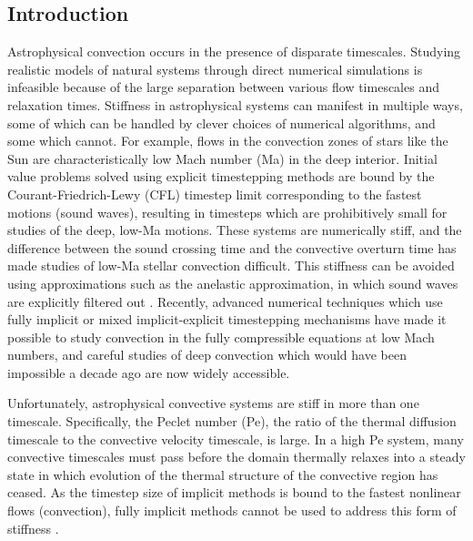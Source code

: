 \subsection{Introduction}
\label{sec:abo18_intro}
Astrophysical convection occurs in the presence of disparate timescales. 
Studying realistic models of natural systems through direct numerical simulations is infeasible because of the large separation between various flow timescales and relaxation times.
Stiffness in astrophysical systems can manifest in multiple ways, some of which can be handled by clever choices of numerical algorithms, and some which cannot.
For example, flows in the convection zones of stars like the Sun are characteristically low Mach number (Ma) in the deep interior. 
Initial value problems solved using explicit timestepping methods are bound by the Courant-Friedrich-Lewy (CFL) timestep limit corresponding to the fastest motions (sound waves), resulting in timesteps which are prohibitively small for studies of the deep, low-Ma motions. 
These systems are numerically stiff, and the difference between the sound crossing time and the convective overturn time has made studies of low-Ma stellar convection difficult. 
This stiffness can be avoided using approximations such as the anelastic approximation, in which sound waves are explicitly filtered out \cite{brown&all2010, featherstone&hindman2016a}.
Recently, advanced numerical techniques which use fully implicit \cite{viallet&all2011, viallet&all2013, viallet&all2016} or mixed implicit-explicit \cite{lecoanet&all2014, anders&brown2017, bordwell&all2018} timestepping mechanisms have made it possible to study convection in the fully compressible equations at low Mach numbers, and careful studies of deep convection which would have been impossible a decade ago are now widely accessible.

Unfortunately, astrophysical convective systems are stiff in more than one timescale. 
Specifically, the Peclet number (Pe), the ratio of the thermal diffusion timescale to the convective velocity timescale, is large.
In a high Pe system, many convective timescales must pass before the domain thermally relaxes into a steady state in which evolution of the thermal structure of the convective region has ceased.
As the timestep size of implicit methods is bound to the fastest nonlinear flows (convection), fully implicit methods cannot be used to address this form of stiffness \cite{viallet&all2011, viallet&all2013, viallet&all2016}. 

